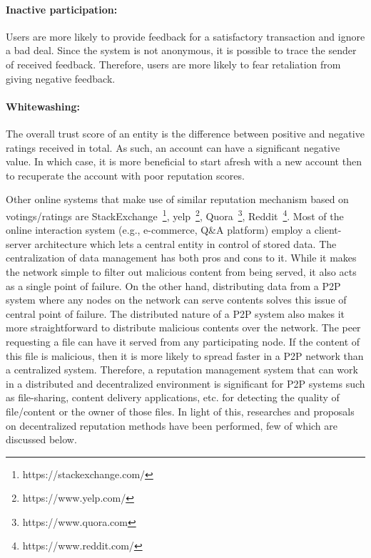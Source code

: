 \paragraph{Inactive participation:} Users are more likely to provide feedback
for a satisfactory transaction and ignore a bad deal. Since the system is not
anonymous, it is possible to trace the sender of received feedback. Therefore,
users are more likely to fear retaliation from giving negative feedback.
\paragraph{Whitewashing:} The overall trust score of an entity is the
difference between positive and negative ratings received in total. As such, an
account can have a significant negative value. In which case, it is more
beneficial to start afresh with a new account then to recuperate the account
with poor reputation scores.

Other online systems that make use of similar reputation mechanism based on
votings/ratings are StackExchange~\footnote{https://stackexchange.com/},
yelp~\footnote{https://www.yelp.com/}, Quora~\footnote{https://www.quora.com},
Reddit~\footnote{https://www.reddit.com/}. Most of the online interaction
system (e.g., e-commerce, Q\&A platform) employ a client-server architecture
which lets a central entity in control of stored data. The centralization of
data management has both pros and cons to it. While it makes the network simple
to filter out malicious content from being served, it also acts as a single
point of failure. On the other hand, distributing data from a P2P system where
any nodes on the network can serve contents solves this issue of central point
of failure. The distributed nature of a P2P system also makes it more
straightforward to distribute malicious contents over the network. The peer
requesting a file can have it served from any participating node. If the
content of this file is malicious, then it is more likely to spread faster in a
P2P network than a centralized system. Therefore, a reputation management
system that can work in a distributed and decentralized environment is
significant for P2P systems such as file-sharing, content delivery
applications, etc. for detecting the quality of file/content or the owner of
those files. In light of this, researches and proposals on decentralized
reputation methods have been performed, few of which are discussed below.\\ 

